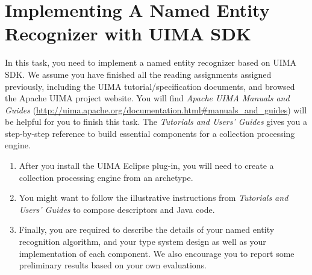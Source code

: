 
\chapter{Implementing A Named Entity Recognizer with UIMA SDK}

In this task, you need to implement a named entity recognizer based on UIMA SDK.
We assume you have finished all the reading assignments assigned previously, including the
UIMA tutorial/specification documents, and browsed the Apache UIMA project website. You will find
\emph{Apache UIMA Manuals and Guides}
(\url{http://uima.apache.org/documentation.html#manuals_and_guides}) will be
helpful for you to finish this task. The \emph{Tutorials and Users' Guides}
gives you a step-by-step reference to build essential components for a
collection processing engine.

\begin{enumerate}

\item After you install the UIMA Eclipse plug-in, you will need to create a
collection processing engine from an archetype.

\item You might want to follow the illustrative instructions from
\emph{Tutorials and Users' Guides} to compose descriptors and Java code.

\item Finally, you are required to describe the details of your named entity
recognition algorithm, and your type system design as well as your
implementation of each component. We also encourage you to report some
preliminary results based on your own evaluations.

\end{enumerate}








